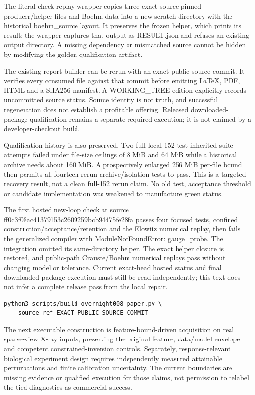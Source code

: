 \documentclass[11pt,letterpaper]{article}
\begin{document}
The literal-check replay wrapper copies three exact source-pinned producer/helper files and Boehm data into a new scratch directory with the historical boehm\_source layout. It preserves the frozen helper, which prints its result; the wrapper captures that output as RESULT.json and refuses an existing output directory. A missing dependency or mismatched source cannot be hidden by modifying the golden qualification artifact.\par
The existing report builder can be rerun with an exact public source commit. It verifies every consumed file against that commit before emitting LaTeX, PDF, HTML and a SHA256 manifest. A WORKING\_TREE edition explicitly records uncommitted source status. Source identity is not truth, and successful regeneration does not establish a profitable offering. Released downloaded-package qualification remains a separate required execution; it is not claimed by a developer-checkout build.\par
Qualification history is also preserved. Two full local 152-test inherited-suite attempts failed under file-size ceilings of 8 MiB and 64 MiB while a historical archive needs about 160 MiB. A prospectively enlarged 256 MiB per-file bound then permits all fourteen rerun archive/isolation tests to pass. This is a targeted recovery result, not a clean full-152 rerun claim. No old test, acceptance threshold or candidate implementation was weakened to manufacture green status.\par
The first hosted new-loop check at source ff0c3f08ac41379153c2609259bcb94475fe28fa passes four focused tests, confined construction/acceptance/retention and the Elowitz numerical replay, then fails the generalized compiler with ModuleNotFoundError: gauge\_probe. The integration omitted its same-directory helper. The exact helper closure is restored, and public-path Crauste/Boehm numerical replays pass without changing model or tolerance. Current exact-head hosted status and final downloaded-package execution must still be read independently; this text does not infer a complete release pass from the local repair.\par
\begin{lstlisting}
python3 scripts/build_overnight008_paper.py \
  --source-ref EXACT_PUBLIC_SOURCE_COMMIT
\end{lstlisting}
The next executable construction is feature-bound-driven acquisition on real sparse-view X-ray inputs, preserving the original feature, data/model envelope and competent constrained-inversion controls. Separately, response-relevant biological experiment design requires independently measured attainable perturbations and finite calibration uncertainty. The current boundaries are missing evidence or qualified execution for those claims, not permission to relabel the tied diagnostics as commercial success.\par
\end{document}

